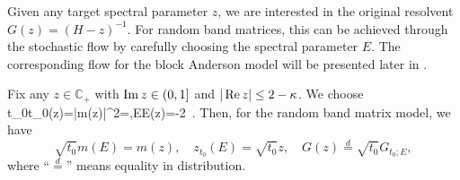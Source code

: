 

Given any target spectral parameter $z$, we are interested in the original resolvent $G(z)=(H-z)^{-1}$. For random band matrices, this can be achieved through the stochastic flow by carefully choosing the spectral parameter $E$. The corresponding flow for the block Anderson model will be presented later in . 


\begin{lemma}\label{zztE}
Fix any $z\in \mathbb C_+$ with $\operatorname{{\mathrm{Im}}} z\in (0, 1]$ and $|\operatorname{{\mathrm{Re}}} z|\le 2-\kappa$. We choose 
	\be\label{eq:t0E0}t_0\equiv t_0(z)=|m(z)|^2=,\quad E\equiv E(z)=-2\, .\ee
	Then, for the random band matrix model, we have  
	\begin{equation}\label{eq:zztE}
		\sqrt{t_0}m(E)=m(z), \quad     z_{t_0}(E) =\sqrt{t_0} z  , \quad G(z) \stackrel{d}{=} \sqrt{t_0} G_{t_0;E} ,
	\end{equation} 
    where ``$\stackrel{d}{=}$'' means equality in distribution.
\end{lemma}



